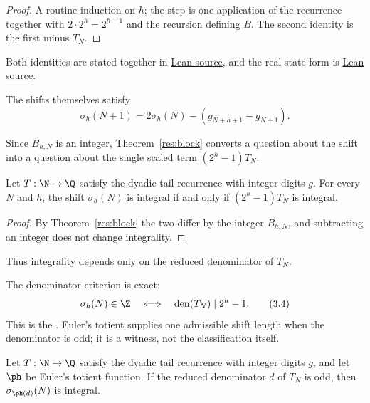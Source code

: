 \documentclass[11pt]{article}
\begin{document}
\begin{proof}
A routine induction on $h$; the step is one application of the recurrence together with
$2\cdot2^{h}=2^{h+1}$ and the recursion defining $B$.  The second identity is
the first minus $T_N$.
\end{proof}

\noindent Both identities are stated together in
\href{https://github.com/wcook04/plectis-erdos/blob/f36a98bf3d3e6f65f1074e3b800e3293d5b8a51a/ErdosProblems/Erdos251/PaperCoreR7.lean#L68}{Lean source}, and the real-state form is
\href{https://github.com/wcook04/plectis-erdos/blob/f36a98bf3d3e6f65f1074e3b800e3293d5b8a51a/ErdosProblems/Erdos251/PaperCoreR7.lean#L76}{Lean source}.

The shifts themselves satisfy
\[
 \sigma_h(N+1)=2\sigma_h(N)-(g_{N+h+1}-g_{N+1}).
\]

Since $B_{h,N}$ is an integer, Theorem~\ref{res:block} converts a question about
the shift into a question about the single scaled term $(2^{h}-1)T_N$.

\begin{theorem}\label{res:shiftiff}
Let $T:\N\to\Q$ satisfy the dyadic tail recurrence with integer digits $g$.
For every $N$ and $h$, the shift $\sigma_h(N)$ is integral if and only if
$(2^{h}-1)T_N$ is integral.
\end{theorem}

\begin{proof}
By Theorem~\ref{res:block} the two differ by the integer $B_{h,N}$, and
subtracting an integer does not change integrality.
\end{proof}

Thus integrality depends only on the reduced denominator of $T_N$.

The denominator criterion is exact:
\[
  \sigma_h(N)\in\Z
  \quad\Longleftrightarrow\quad
  \operatorname{den}(T_N)\mid 2^h-1.
\tag{3.4}\label{eq:shift-denominator}
\]
This is the
.  Euler's totient supplies one admissible shift length when
the denominator is odd; it is a witness, not the classification itself.

\begin{theorem}\label{res:totient}
Let $T:\N\to\Q$ satisfy the dyadic tail recurrence with integer digits $g$, and
let $\ph$ be Euler's totient function.  If the reduced denominator $d$ of
$T_N$ is odd, then $\sigma_{\ph(d)}(N)$ is integral.
\end{theorem}
\end{document}
